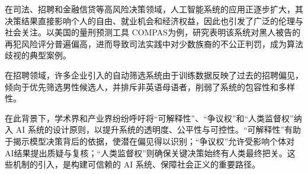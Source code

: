 
在司法、招聘和金融信贷等高风险决策领域，人工智能系统的应用正逐步扩大，其决策结果直接影响个人的自由、就业机会和经济权益，因此也引发了广泛的伦理与社会关注。以美国的量刑预测工具 COMPAS为例，研究表明该系统对黑人被告的再犯风险评分普遍偏高，进而导致司法实践中对少数族裔的不公正判罚\cite{Angwin2016MachineBias}，成为算法歧视的典型案例。

在招聘领域，许多企业引入的自动筛选系统由于训练数据反映了过去的招聘偏见，倾向于优先筛选男性候选人，并排斥非英语母语者，削弱了系统的包容性和多样性。

在此背景下，学术界和产业界纷纷呼吁将“可解释性”、“争议权”和“人类监督权”纳入 AI 系统的设计原则，以提升系统的透明度、公平性与可控性。“可解释性”有助于揭示模型决策背后的依据，使潜在偏见得以识别；“争议权”允许受影响个体对 AI结果提出质疑与复核；“人类监督权”则确保关键决策始终有人类最终把关。这些机制的引入，是构建可信赖的 AI 系统、保障社会正义的重要路径。
